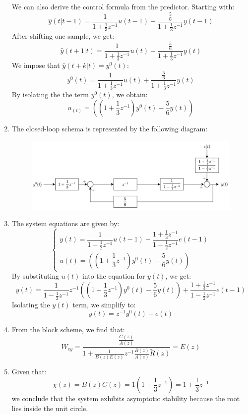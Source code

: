 \begin{enumerate}
        We can also derive the control formula from the predictor. 
        Starting with:
        \[\hat{y}(t|t-1)=\dfrac{1}{1+\frac{1}{3}z^{-1}}u(t-1)+\dfrac{\frac{5}{6}}{1+\frac{1}{3}z^{-1}}y(t-1)\]
        After shifting one sample, we get:
        \[\hat{y}(t+1|t)=\dfrac{1}{1+\frac{1}{3}z^{-1}}u(t)+\dfrac{\frac{5}{6}}{1+\frac{1}{3}z^{-1}}y(t)\]
        We impose that $\hat{y}(t+k|t)=y^0(t)$: 
        \[y^0(t)=\dfrac{1}{1+\frac{1}{3}z^{-1}}u(t)+\dfrac{\frac{5}{6}}{1+\frac{1}{3}z^{-1}}y(t)\]
        By isolating the the term $y^0(t)$, we obtain:
        \[u_(t)=\left(\left(1+\dfrac{1}{3}z^{-1}\right)y^0(t)-\dfrac{5}{6}y(t)\right)\]
    \item The closed-loop schema is represented by the following diagram:
        \begin{figure}[H]
            \centering
            \includegraphics[width=0.75\linewidth]{images/ex2.png}
        \end{figure}
    \item The system equations are given by:
        \[\begin{cases}
            y(t)=\dfrac{1}{1-\frac{1}{2}z^{-1}}u(t-1)+\dfrac{1+\frac{1}{3}z^{-1}}{1-\frac{1}{2}z^{-1}}e(t-1) \\
            u(t)=\left(\left(1+\dfrac{1}{3}z^{-1}\right)y^0(t)-\dfrac{5}{6}y(t)\right)
        \end{cases}\]
        By substituting $u(t)$ into the equation for $y(t)$, we get:
        \[y(t)=\dfrac{1}{1-\frac{1}{2}z^{-1}}z^{-1}\left(\left(1+\dfrac{1}{3}z^{-1}\right)y^0(t)-\dfrac{5}{6}y(t)\right)+\dfrac{1+\frac{1}{3}z^{-1}}{1-\frac{1}{2}z^{-1}}e(t-1)\]
        Isolating the $y(t)$ term, we simplify to:
        \[y(t)=z^{-1}y^0(t)+e(t)\]
    \item From the block scheme, we find that:
        \[W_{ey}=\dfrac{\frac{C(z)}{A(z)}}{1+\frac{1}{B(z)E(z)}z^{-1}\frac{B(z)}{A(z)}\tilde{R}(z)}=E(z)\]
    \item Given that:
        \[\chi(z)=B(z)C(z)=1\left(1+\dfrac{1}{3}z^{-1}\right)=1+\dfrac{1}{3}z^{-1}\]
        we conclude that the system exhibits asymptotic stability because the root lies inside the unit circle.
\end{enumerate}